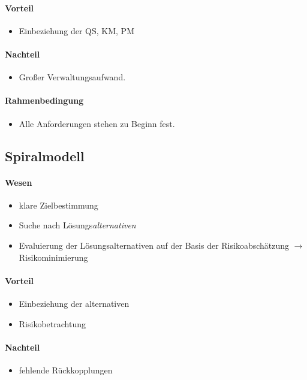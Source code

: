 \paragraph{Vorteil}
\begin{itemize}
\item Einbeziehung der QS, KM, PM 
\end{itemize}

\paragraph{Nachteil}
\begin{itemize}
\item Großer Verwaltungsaufwand. 
\end{itemize}

\paragraph{Rahmenbedingung}
\begin{itemize}
\item Alle Anforderungen stehen zu Beginn fest.
\end{itemize}

\subsection{Spiralmodell}
\paragraph{Wesen} 
\begin{itemize}
\item klare Zielbestimmung
\item Suche nach Lösungs\emph{alternativen}
\item Evaluierung der Lösungsalternativen auf der Basis der Risikoabschätzung $\to $ Risikominimierung
\end{itemize}

\paragraph{Vorteil}
\begin{itemize}
\item Einbeziehung der alternativen
\item Risikobetrachtung
\end{itemize}

\paragraph{Nachteil}
\begin{itemize}
\item fehlende Rückkopplungen
\end{itemize}

